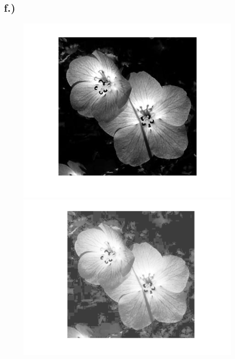 \documentclass{scrartcl}
\begin{document}
\subsection*{f.)}

%

\begin{figure}[htp!]
	\begin{minipage}[t]{0.3\textwidth}
		\includegraphics[width=\textwidth]{flower_imadjust.png}
	\end{minipage}
	\begin{minipage}[t]{0.3\textwidth}
		\includegraphics[width=\textwidth]{flower_eq.png}

\end{minipage}
\end{figure}
\end{document}
